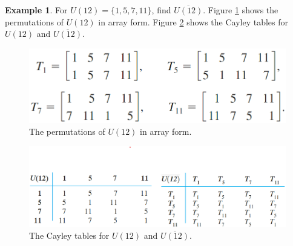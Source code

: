 \documentclass{article}
\theoremstyle{definition}
\newtheorem{example}{Example}[section]
\begin{document}
 \begin{example}
     For $U(12) = \{1,5,7,11\}$, find $\overline{U(12)}$. Figure \ref{permutation_U(12)} shows the permutations of $U(12)$ in array form. Figure \ref{cayley_table_U(12)} shows the Cayley tables for $U(12)$ and $\overline{U(12)}$.
     
     \begin{figure}[!htbp]
         \centering
         \includegraphics[width=0.6\linewidth]{figures/permutation_U(12).png}
         \caption{The permutations of $U(12)$ in array form.}
         \label{permutation_U(12)}
     \end{figure}
     
     \begin{figure}[!htbp]
         \centering
         \includegraphics[width=\linewidth]{figures/cayley_table_U(12).png}
         \caption{The Cayley tables for $U(12)$ and $\overline{U(12)}$.}
         \label{cayley_table_U(12)}
     \end{figure}
 \end{example}
 
\end{document}
